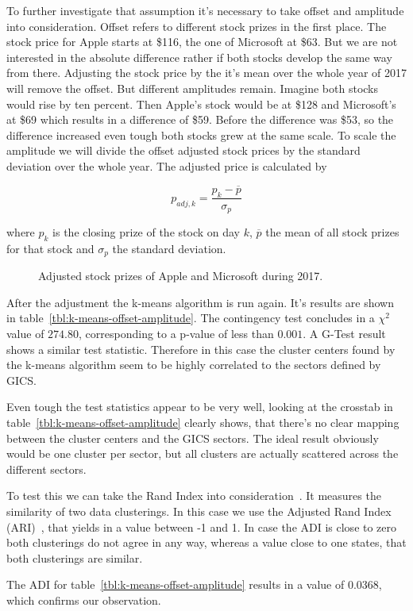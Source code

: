 To further investigate that assumption it's necessary to take offset and amplitude into consideration. Offset refers to different stock prizes in the first place. The stock price for Apple starts at \$116, the one of Microsoft at \$63. But we are not interested in the absolute difference rather if both stocks develop the same way from there. Adjusting the stock price by the it's mean over the whole year of 2017 will remove the offset. But different amplitudes remain. Imagine both stocks would rise by ten percent. Then Apple's stock would be at \$128 and Microsoft's at \$69 which results in a difference of \$59. Before the difference was \$53, so the difference increased even tough both stocks grew at the same scale. To scale the amplitude we will divide the offset adjusted stock prices by the standard deviation over the whole year. The adjusted price is calculated by 

\begin{equation}\label{eq:off-amp-adj}
	p_{adj, k} = \frac{p_k - \overline{p}}{\sigma_p}
\end{equation}

where $p_k$ is the closing prize of the stock on day $k$, $\overline{p}$ the mean of all stock prizes for that stock and $\sigma_p$ the standard deviation.

\begin{figure}\label{fig:appl-vs-msft_adj}
	\centering
	
	\caption{Adjusted stock prizes of Apple and Microsoft during 2017.}
\end{figure}

After the adjustment the k-means algorithm is run again. It's results are shown in table~\ref{tbl:k-means-offset-amplitude}. The contingency test concludes in a $\chi^2$ value of $274.80$, corresponding to a p-value of less than $0.001$. A G-Test result shows a similar test statistic. Therefore in this case the cluster centers found by the k-means algorithm seem to be highly correlated to the sectors defined by GICS.



Even tough the test statistics appear to be very well, looking at the crosstab in table~\ref{tbl:k-means-offset-amplitude} clearly shows, that there's no clear mapping between the cluster centers and the GICS sectors. The ideal result obviously would be one cluster per sector, but all clusters are actually scattered across the different sectors.

To test this we can take the Rand Index into consideration~\cite{rand1971objective}. It measures the similarity of two data clusterings. In this case we use the Adjusted Rand Index (ARI)~\cite{hubert1985comparing}, that yields in a value between -1 and 1. In case the ADI is close to zero both clusterings do not agree in any way, whereas a value close to one states, that both clusterings are similar.

The ADI for table~\ref{tbl:k-means-offset-amplitude} results in a value of 0.0368, which confirms our observation.



